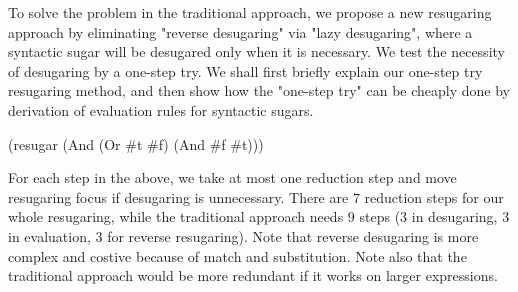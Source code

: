 To solve the problem in the traditional approach, we propose a new resugaring approach by eliminating "reverse desugaring" via "lazy desugaring", where a syntactic sugar will be desugared only when it is necessary. We test the necessity of desugaring by a one-step try. We shall first briefly explain our one-step try resugaring method, and then show how the "one-step try" can be cheaply done by derivation of evaluation rules for syntactic sugars.
\begin{Codes}
    (resugar (And (Or \#t \#f) (And \#f \#t)))
 
 
\end{Codes}

For each step in the above, we take at most one reduction step and move resugaring focus if desugaring is unnecessary. There are $7$ reduction steps for our whole resugaring, while the traditional approach needs $9$ steps ($3$ in desugaring, $3$ in evaluation, $3$ for reverse resugaring). Note that reverse desugaring is more complex and costive because of match and substitution. Note also that the traditional approach would be more redundant if it works on larger expressions.

